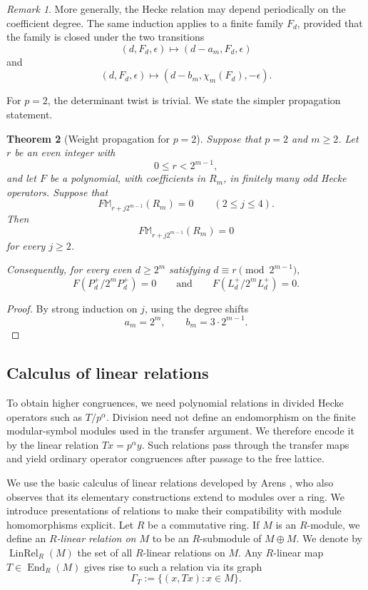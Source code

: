 \documentclass[11pt]{article}
\theoremstyle{plain}
\newtheorem{theorem}{Theorem}[section]
\theoremstyle{definition}
\theoremstyle{remark}
\newtheorem{remark}[theorem]{Remark}
\numberwithin{equation}{section}
\begin{document}
\begin{remark}\label{rem:periodic-weight-propagation} More generally, the Hecke relation may depend periodically on the coefficient degree. The same induction applies to a finite family \(F_d\), provided that the family is closed under the two transitions \[ (d,F_d,\epsilon) \longmapsto (d-a_m,F_d,\epsilon) \] and \[ (d,F_d,\epsilon) \longmapsto (d-b_m,\chi_m(F_d),-\epsilon). \] 
\end{remark}

For \(p=2\), the determinant twist is trivial. We state the simpler propagation statement.

\begin{theorem}[Weight propagation for \(p=2\)] \label{thm:weight-propagation-p2} Suppose that \(p=2\) and \(m\geq2\). Let \(r\) be an even integer with \[0\leq r<2^{m-1}, \] and let \(F\) be a polynomial, with coefficients in \(R_m\), in finitely many odd Hecke operators. Suppose that \[F\mathbb M_{r+j2^{m-1}}(R_m) = 0 \qquad (2\leq j\leq4). \] Then \[F\mathbb M_{r+j2^{m-1}}(R_m) = 0 \] for every \(j\geq 2\).

Consequently, for every even \(d\geq 2^{m}\) satisfying \(d\equiv r\pmod{2^{m-1}},\) \[F \left(P_d^+ / 2^m P_d^+\right) = 0 \qquad\text{and}\qquad F\left( L_d^+ / 2^m L_d^+\right) = 0. \]
\end{theorem}

\begin{proof} By strong induction on \(j\), using the degree shifts \[ a_m=2^m, \qquad b_m=3\cdot2^{m-1}. \]
\end{proof}

\subsection{Calculus of linear relations}

To obtain higher congruences, we need polynomial relations in divided Hecke operators such as \(T/p^\alpha\). Division need not define an endomorphism on the finite modular-symbol modules used in the transfer argument. We therefore encode it by the linear relation \(Tx=p^\alpha y\). Such relations pass through the transfer maps and yield ordinary operator congruences after passage to the free lattice.

We use the basic calculus of linear relations developed by Arens \cite[\S~2]{Arens1961}, who also observes that its elementary constructions extend to modules over a ring. We introduce presentations of relations to make their compatibility with module homomorphisms explicit. Let $R$ be a commutative ring. If $M$ is an $R$-module, we define an \emph{$R$-linear relation on $M$} to be an $R$-submodule of $M \oplus M$. We denote by $\operatorname{LinRel}_R(M)$ the set of all $R$-linear relations on $M$. Any $R$-linear map $T \in \operatorname{End}_R(M)$ gives rise to such a relation via its graph \[\Gamma_T := \{(x,Tx): x \in M\}.\]
\end{document}
